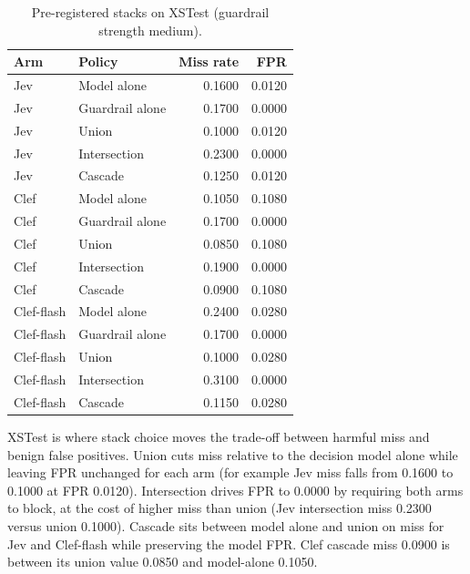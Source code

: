 \begin{table}[t]
  \centering
  \caption{Pre-registered stacks on XSTest (guardrail strength medium).}
  \label{tab:stack-xstest}
  \begin{tabular}{llrr}
    \toprule
    Arm & Policy & Miss rate & FPR \\
    \midrule
    Jev & Model alone & 0.1600 & 0.0120 \\
    Jev & Guardrail alone & 0.1700 & 0.0000 \\
    Jev & Union & 0.1000 & 0.0120 \\
    Jev & Intersection & 0.2300 & 0.0000 \\
    Jev & Cascade & 0.1250 & 0.0120 \\
    \midrule
    Clef & Model alone & 0.1050 & 0.1080 \\
    Clef & Guardrail alone & 0.1700 & 0.0000 \\
    Clef & Union & 0.0850 & 0.1080 \\
    Clef & Intersection & 0.1900 & 0.0000 \\
    Clef & Cascade & 0.0900 & 0.1080 \\
    \midrule
    Clef-flash & Model alone & 0.2400 & 0.0280 \\
    Clef-flash & Guardrail alone & 0.1700 & 0.0000 \\
    Clef-flash & Union & 0.1000 & 0.0280 \\
    Clef-flash & Intersection & 0.3100 & 0.0000 \\
    Clef-flash & Cascade & 0.1150 & 0.0280 \\
    \bottomrule
  \end{tabular}
\end{table}

XSTest is where stack choice moves the trade-off between harmful miss and benign false positives.
Union cuts miss relative to the decision model alone while leaving FPR unchanged for each arm (for example Jev miss falls from 0.1600 to 0.1000 at FPR 0.0120).
Intersection drives FPR to 0.0000 by requiring both arms to block, at the cost of higher miss than union (Jev intersection miss 0.2300 versus union 0.1000).
Cascade sits between model alone and union on miss for Jev and Clef-flash while preserving the model FPR.
Clef cascade miss 0.0900 is between its union value 0.0850 and model-alone 0.1050.

